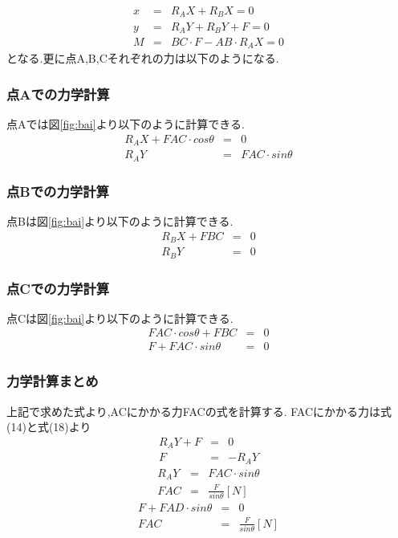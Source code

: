 \documentclass[11pt]{jsarticle}
\begin{document}
\begin{eqnarray}
	x & = & R_AX+R_BX=0 \\
	y & = & R_AY+R_BY+F=0 \\
	M & = & BC\cdot F-AB\cdot R_AX=0
\end{eqnarray}
となる.更に点A,B,Cそれぞれの力は以下のようになる.

\subsubsection{点Aでの力学計算}
点Aでは図\ref{fig:bai}より以下のように計算できる.
\begin{eqnarray}
	R_AX+FAC\cdot cosθ & = & 0 \\
	R_AY & = & FAC\cdot sinθ 
\end{eqnarray}
\subsubsection{点Bでの力学計算}
点Bは図\ref{fig:bai}より以下のように計算できる.
\begin{eqnarray}
	R_BX+FBC & = & 0 \\
	R_BY & = & 0
\end{eqnarray}
\subsubsection{点Cでの力学計算}
点Cは図\ref{fig:bai}より以下のように計算できる.
\begin{eqnarray}
	FAC\cdot cosθ+FBC & = & 0 \\
	F+FAC\cdot sinθ & = & 0
\end{eqnarray}
\subsubsection{力学計算まとめ}
上記で求めた式より,ACにかかる力FACの式を計算する.
FACにかかる力は式(14)と式(18)より
\begin{eqnarray}
	R_AY+F & = & 0 \\
		F & = & -R_AY 
\end{eqnarray}
\begin{eqnarray}
	　　　　R_AY & = & FAC\cdot sinθ \\
		FAC & = & \frac{F}{sinθ} [N] 
\end{eqnarray}
\begin{eqnarray}
	F+FAD\cdot sinθ & = & 0 \\
	FAC & = & \frac{F}{sinθ} [N]
\end{eqnarray}
\end{document}
